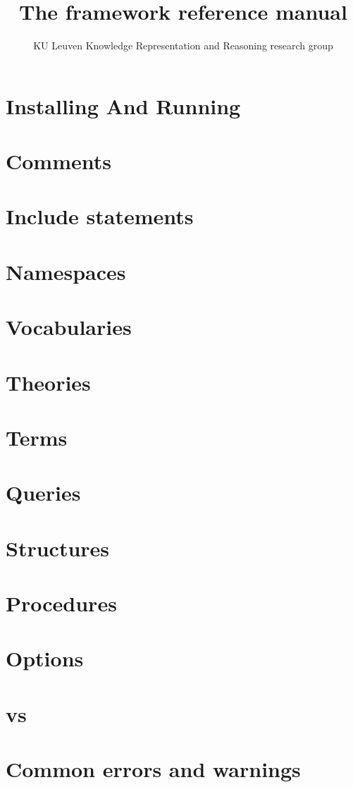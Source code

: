 \documentclass[a4]{article}
\title{The \idp framework reference manual}
\author{KU Leuven Knowledge Representation and Reasoning research group}
\begin{document}
\maketitle
\setlength{\parindent}{0pt}
\newpage
\tableofcontents
\newpage


\section{Installing And Running}


\section{Comments}


\section{Include statements}


\section{Namespaces}


\section{Vocabularies}


\section{Theories}


\section{Terms}


\section{Queries}


\section{Structures}


\section{Procedures}


\section{Options}


\section{\idptwo vs \idpthree}


\section{Common errors and warnings}

\end{document}

